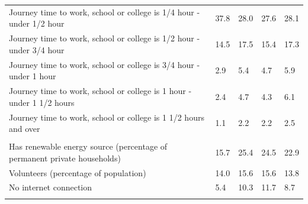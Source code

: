 \documentclass{article}
\begin{document}
\begin{table}[h]
\begin{tabular}{KTTTT}
Journey time to work, school or college is 1/4 hour - under 1/2 hour & 37.8& 28.0& 27.6& 28.1\\
Journey time to work, school or college is 1/2 hour - under 3/4 hour & 14.5& 17.5& 15.4& 17.3\\
Journey time to work, school or college is 3/4 hour - under 1 hour & 2.9& 5.4& 4.7& 5.9\\
Journey time to work, school or college is 1 hour - under 1 1/2 hours & 2.4& 4.7& 4.3& 6.1\\
Journey time to work, school or college is 1 1/2 hours and over & 1.1& 2.2& 2.2& 2.5\\
\hline
    \\ 
    \hline
Has renewable energy source (percentage of permanent private households) & 15.7& 25.4& 24.5& 22.9\\
    \hline
Volunteers (percentage of population) & 14.0& 15.6& 15.6& 13.8\\
    \hline
No internet connection&  5.4& 10.3& 11.7&  8.7\\
\hline
\end{tabular}
\end{table}
\end{document}
